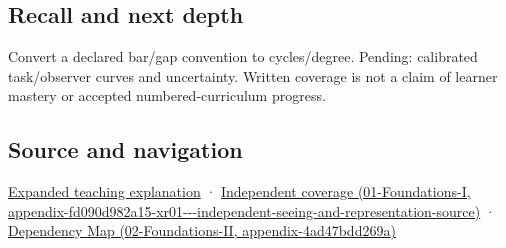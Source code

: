 \subsection{Recall and next depth}\label{appendix-b491fc48c54b-recall-and-next-depth}

Convert a declared bar/gap convention to cycles/degree. Pending: calibrated task/observer curves and uncertainty. Written coverage is not a claim of learner mastery or accepted numbered-curriculum progress.

\subsection{Source and navigation}\label{appendix-b491fc48c54b-source-and-navigation}

\href{Continuous\%20Notes/University\%20-\%20Worlds,\%20Images\%20and\%20Inference\%20-\%20Graphics,\%20Vision\%20and\%20Photography\#Visibility\%20is\%20about\%20contrast,\%20conditions\%20and\%20tasks}{Expanded teaching explanation} · \href{../01-Foundations-I/main.pdf\#nameddest=appendix-fd090d982a15-xr01---independent-seeing-and-representation-source}{Independent coverage (01-Foundations-I, appendix-fd090d982a15-xr01-\/-\/-independent-seeing-and-representation-source)} · \href{../02-Foundations-II/main.pdf\#nameddest=appendix-4ad47bdd269a}{Dependency Map (02-Foundations-II, appendix-4ad47bdd269a)}
